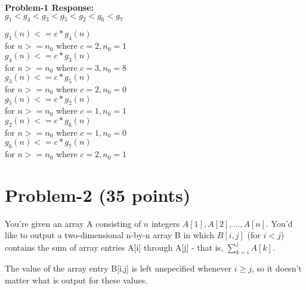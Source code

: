 \documentclass[11pt]{article}
\begin{document}
\bigskip
\bigskip
\noindent
\medskip
{\bf Problem-1 Response:}\\
$g_1 < g_4 < g_3 < g_5 < g_2 < g_6 < g_7$\\
\bigskip

\noindent
$g_1(n) <= c * g_4(n)$
\smallskip\\
\indent for $n >= n_0 $ where $c = 2, n_0 = 1$\\

\noindent
$g_4(n) <= c * g_3(n)$
\smallskip\\
\indent for $n >= n_0 $ where $c = 3, n_0 = 8$\\

\noindent
$g_3(n) <= c * g_5(n)$
\smallskip\\
\indent for $n >= n_0 $ where $c = 2, n_0 = 0$\\

\noindent
$g_5(n) <= c * g_2(n)$
\smallskip\\
\indent for $n >= n_0 $ where $c = 1, n_0 = 1$\\

\noindent
$g_2(n) <= c * g_6(n)$
\smallskip\\
\indent for $n >= n_0 $ where $c = 1, n_0 = 0$\\

\noindent
$g_6(n) <= c * g_7(n)$
\smallskip\\
\indent for $n >= n_0 $ where $c = 2, n_0 = 1$\\


\newpage
\section*{Problem-2 (35 points)}

You're given an array A consisting of $n$ integers $A[1], A[2],...,A[n]$. You'd like to output a two-dimensional n-by-n array B in which $B[i,j]$ (for $i < j$) contains the sum of array entries A[i] through A[j] - that is, $\sum_{k=i}^j A[k]$. 

The value of the array entry B[i,j] is left unspecified whenever $i \geq j$, so it doesn't matter what is output for these values.
\end{document}

